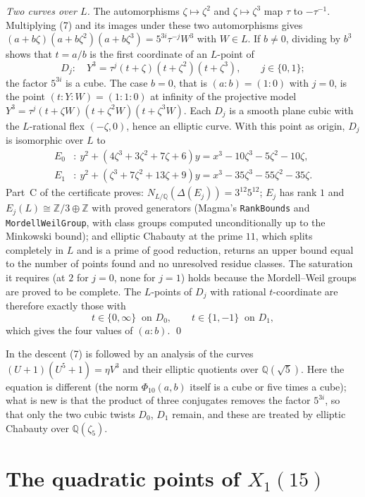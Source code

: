 \documentclass[11pt]{article}
\newcommand{\Q}{\mathbb Q}
\newcommand{\Z}{\mathbb Z}
\begin{document}
\emph{Two curves over \(L\).} The automorphisms \(\zeta\mapsto\zeta^2\) and \(\zeta\mapsto\zeta^3\) map
\(\tau\) to \(-\tau^{-1}\). Multiplying (7) and its images under these two automorphisms gives
\((a+b\zeta)(a+b\zeta^2)(a+b\zeta^3)=5^{3i}\tau^{-j}W^3\) with \(W\in L\). If \(b\neq0\), dividing by
\(b^3\) shows that \(t=a/b\) is the first coordinate of an \(L\)-point of
\[D_j:\quad Y^3=\tau^j(t+\zeta)(t+\zeta^2)(t+\zeta^3),\qquad j\in\{0,1\};\tag{8}\]
the factor \(5^{3i}\) is a cube. The case \(b=0\), that is \((a:b)=(1:0)\) with \(j=0\), is the point \((t:Y:W)=(1:1:0)\) at
infinity of the projective model \(Y^3=\tau^j(t+\zeta W)(t+\zeta^2W)(t+\zeta^3W)\). Each \(D_j\) is a smooth plane cubic with the
\(L\)-rational flex \((-\zeta,0)\), hence an elliptic curve. With this point as origin, \(D_j\) is
isomorphic over \(L\) to
\[\begin{aligned}
E_0&:\ y^2+(4\zeta^3+3\zeta^2+7\zeta+6)y=x^3-10\zeta^3-5\zeta^2-10\zeta,\\
E_1&:\ y^2+(\zeta^3+7\zeta^2+13\zeta+9)y=x^3-35\zeta^3-55\zeta^2-35\zeta.
\end{aligned}\]
Part~C of the certificate proves: \(N_{L/\Q}(\Delta(E_j))=3^{12}5^{12}\); \(E_j\) has rank \(1\) and
\(E_j(L)\cong\Z/3\oplus\Z\) with proved generators (Magma's \texttt{RankBounds} and
\texttt{MordellWeilGroup}, with class groups computed unconditionally up to the Minkowski bound); and elliptic Chabauty \cite{Br} at the prime \(11\), which splits
completely in \(L\) and is a prime of good reduction, returns an upper bound equal to the number of
points found and no unresolved residue classes. The saturation it requires (at \(2\) for \(j=0\), none
for \(j=1\)) holds because the Mordell--Weil groups are proved to be complete. The \(L\)-points of
\(D_j\) with rational \(t\)-coordinate are therefore exactly those with
\[t\in\{0,\infty\}\ \text{ on } D_0,\qquad t\in\{1,-1\}\ \text{ on } D_1,\tag{9}\]
which gives the four values of \((a:b)\). \qed

\medskip
In \cite[Section~4]{Po} the descent (7) is followed by an analysis of the curves
\((U+1)(U^5+1)=\eta V^3\) and their elliptic quotients over \(\Q(\sqrt5)\). Here the equation is
different (the norm \(\Phi_{10}(a,b)\) itself is a cube or five times a cube); what is new is that the
product of three conjugates removes the factor \(5^{3i}\), so that only the two cubic twists
\(D_0\), \(D_1\) remain, and these are treated by elliptic Chabauty over \(\Q(\zeta_5)\).

\section{The quadratic points of \(X_1(15)\)}\label{families}
\end{document}
